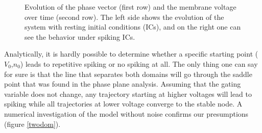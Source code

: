 \documentclass[12pt,a4paper]{article}
\begin{document}
\begin{figure}[H]
	\caption{Evolution of the phase vector (first row) and the membrane voltage over time (second row).
		The left side shows the evolution of the system with resting initial conditions (ICs), and on the right one can see the behavior under spiking ICs.}
	\label{subfig} 
\end{figure}
Analytically, it is hardly possible to determine whether a specific starting point ($V_0$,$n_0$) leads to repetitive spiking or no spiking at all. The only thing one can say for sure is that the line that separates both domains will go through the saddle point that was found in the phase plane analysis. Assuming that the gating variable does not change, any trajectory starting at higher voltages will lead to spiking while all trajectories at lower voltage converge to the stable node. A numerical investigation of the model without noise confirms our presumptions (figure \ref{twodom}).
\end{document}
